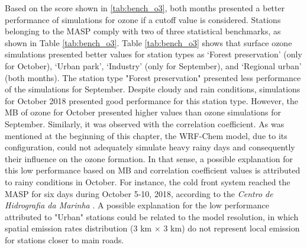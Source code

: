  Based on the score shown in \ref{tab:bench_o3}, both months presented a better performance of simulations for ozone if a cutoff value is considered. 
Stations belonging to the MASP comply with two of three statistical benchmarks, as shown in Table \ref{tab:bench_o3}.
Table \ref{tab:bench_o3} shows that surface ozone simulations presented better values for station types as `Forest preservation' (only for October), `Urban park', `Industry' (only for September), and `Regional urban' (both months).
The station type "Forest preservation" presented less performance of the simulations for September.
 Despite cloudy and rain conditions, simulations for October 2018 presented good performance for this station type.
 However, the MB of ozone for October presented higher values than ozone simulations for September.
 Similarly, it was observed with the correlation coefficient.
 As was mentioned at the beginning of this chapter, the WRF-Chem model, due to its configuration, could not adequately simulate heavy rainy days and consequently their influence on the ozone formation.
  In that sense, a possible explanation for this low performance based on MB and correlation coefficient values is attributed to rainy conditions in October. For instance, the cold front system reached the MASP for six days during October 5-10, 2018, according to the \textit{Centro de Hidrografia da Marinha} \citep{CHM2020}.
  A possible explanation for the low performance attributed to "Urban" stations could be related to the model resolution, in which spatial emission rates distribution (3 km $\times$ 3 km) do not represent local emission for stations closer to main roads.
  
